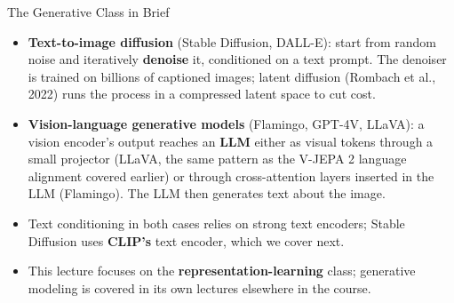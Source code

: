 \begin{frame}{The Generative Class in Brief}
  \begin{itemize}\itemsep0.3em
    \item \textbf{Text-to-image diffusion} (Stable Diffusion, DALL-E): start from random noise and iteratively \textbf{denoise} it, conditioned on a text prompt. The denoiser is trained on billions of captioned images; latent diffusion (Rombach et al., 2022) runs the process in a compressed latent space to cut cost.
    \item \textbf{Vision-language generative models} (Flamingo, GPT-4V, LLaVA): a vision encoder's output reaches an \textbf{LLM} either as visual tokens through a small projector (LLaVA, the same pattern as the V-JEPA 2 language alignment covered earlier) or through cross-attention layers inserted in the LLM (Flamingo). The LLM then generates text about the image.
    \item Text conditioning in both cases relies on strong text encoders; Stable Diffusion uses \textbf{CLIP's} text encoder, which we cover next.
    \item This lecture focuses on the \textbf{representation-learning} class; generative modeling is covered in its own lectures elsewhere in the course.
  \end{itemize}
\end{frame}
